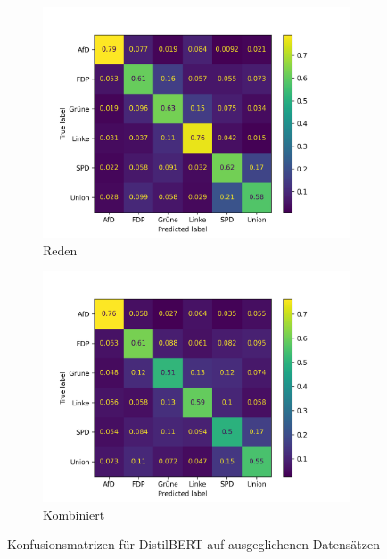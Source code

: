 \begin{figure}[H]
\begin{subfigure}{0.49\textwidth}
      \includegraphics[width=\textwidth]{data/images/modeling/bert/under/speeches_confusion_matrix.png}
      \caption{Reden} \label{sfig:confusionMatrixBertSpeeches}
    \end{subfigure}
    \hfill
    \begin{subfigure}{0.49\textwidth}
      \includegraphics[width=\textwidth]{data/images/modeling/bert/under/all_confusion_matrix.png}
      \caption{Kombiniert} \label{sfig:confusionMatrixBertAll}
    \end{subfigure}
    \caption{Konfusionsmatrizen für DistilBERT auf ausgeglichenen Datensätzen} \label{fig:confusionMatrixDistilbert}
\end{figure}

